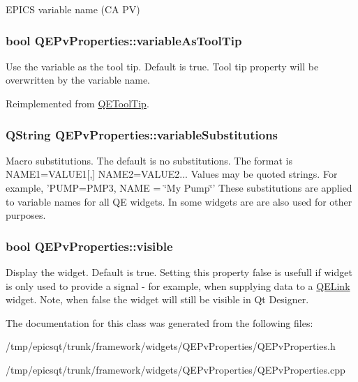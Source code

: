 \label{classQEPvProperties_a31bee423fb3b272fe17668fc0345e09d}
EPICS variable name (CA PV) \hypertarget{classQEPvProperties_ab48657eda59899edf0fbcce4305f98ba}{
\subsubsection[{variableAsToolTip}]{\setlength{\rightskip}{0pt plus 5cm}bool QEPvProperties::variableAsToolTip}}
\label{classQEPvProperties_ab48657eda59899edf0fbcce4305f98ba}
Use the variable as the tool tip. Default is true. Tool tip property will be overwritten by the variable name. 

Reimplemented from \hyperlink{classQEToolTip}{QEToolTip}.

\hypertarget{classQEPvProperties_a789c36ecaf17a83e04f8beaaf194577d}{
\subsubsection[{variableSubstitutions}]{\setlength{\rightskip}{0pt plus 5cm}QString QEPvProperties::variableSubstitutions}}
\label{classQEPvProperties_a789c36ecaf17a83e04f8beaaf194577d}
Macro substitutions. The default is no substitutions. The format is NAME1=VALUE1\mbox{[},\mbox{]} NAME2=VALUE2... Values may be quoted strings. For example, 'PUMP=PMP3, NAME = \char`\"{}My Pump\char`\"{}' These substitutions are applied to variable names for all QE widgets. In some widgets are are also used for other purposes. \hypertarget{classQEPvProperties_a746d04a72a50e51f1515b4671bd3107f}{
\subsubsection[{visible}]{\setlength{\rightskip}{0pt plus 5cm}bool QEPvProperties::visible}}
\label{classQEPvProperties_a746d04a72a50e51f1515b4671bd3107f}
Display the widget. Default is true. Setting this property false is usefull if widget is only used to provide a signal -\/ for example, when supplying data to a \hyperlink{classQELink}{QELink} widget. Note, when false the widget will still be visible in Qt Designer. 

The documentation for this class was generated from the following files:\begin{DoxyCompactItemize}
\item 
/tmp/epicsqt/trunk/framework/widgets/QEPvProperties/QEPvProperties.h\item 
/tmp/epicsqt/trunk/framework/widgets/QEPvProperties/QEPvProperties.cpp\end{DoxyCompactItemize}

